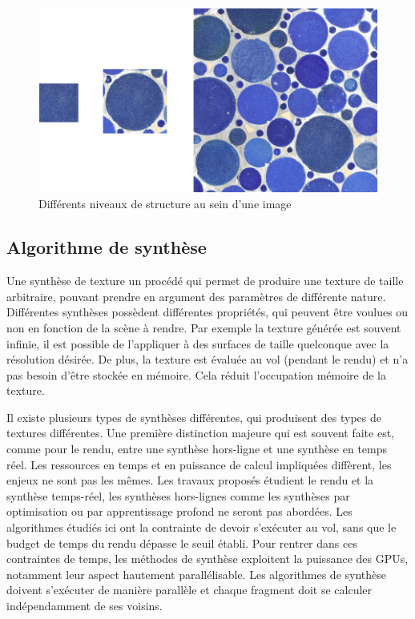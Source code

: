 \begin{figure}[ht!]
    \centering
    \includegraphics[width=.85\linewidth]{contenu/resources/images/structure_level}
    \caption{Différents niveaux de structure au sein d'une image}
    \label{fig:structure-level}
\end{figure}

\subsection*{Algorithme de synthèse}

Une synthèse de texture un procédé qui permet de produire une texture de taille arbitraire, pouvant prendre en argument des paramètres de différente nature. Différentes synthèses possèdent différentes propriétés, qui peuvent être voulues ou non en fonction de la scène à rendre. Par exemple la texture générée est souvent infinie, il est possible de l'appliquer à des surfaces de taille quelconque avec la résolution désirée. De plus, la texture est évaluée au vol (pendant le rendu) et n'a pas besoin d'être stockée en mémoire. Cela réduit l'occupation mémoire de la texture.

\bigskip

Il existe plusieurs types de synthèses différentes, qui produisent des types de textures différentes. Une première distinction majeure qui est souvent faite est, comme pour le rendu, entre une synthèse hors-ligne et une synthèse en temps réel. Les ressources en temps et en puissance de calcul impliquées diffèrent, les enjeux ne sont pas les mêmes. Les travaux proposés étudient le rendu et la synthèse temps-réel, les synthèses hors-lignes comme les synthèses par optimisation ou par apprentissage profond ne seront pas abordées. Les algorithmes étudiés ici ont la contrainte de devoir s'exécuter au vol, sans que le budget de temps du rendu dépasse le seuil établi. Pour rentrer dans ces contraintes de temps, les méthodes de synthèse exploitent la puissance des GPUs, notamment leur aspect hautement parallélisable. Les algorithmes de synthèse doivent s'exécuter de manière parallèle et chaque fragment doit se calculer indépendamment de ses voisins.

